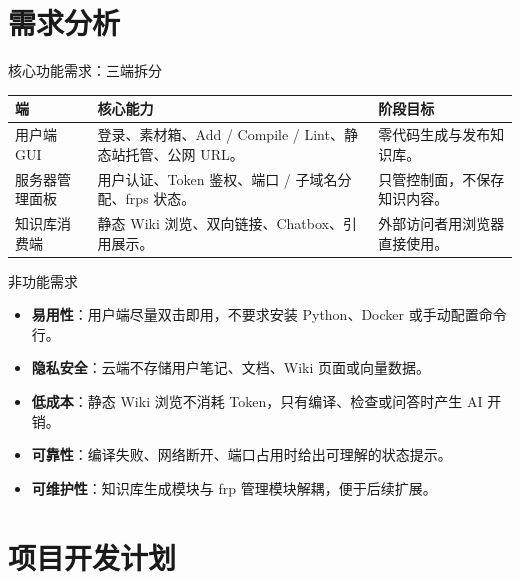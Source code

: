 \documentclass[aspectratio=169]{beamer}
\newcommand{\keypoint}[1]{\textcolor{whu}{\textbf{#1}}}
\begin{document}
\section{需求分析}

\begin{frame}{核心功能需求：三端拆分}
    \small
    \begin{tabularx}{\textwidth}{>{\raggedright\arraybackslash}p{}p{}X}
        \toprule
        \textbf{端} & \textbf{核心能力} & \textbf{阶段目标} \\
        \midrule
        用户端 GUI & 登录、素材箱、Add / Compile / Lint、静态站托管、公网 URL。 & 零代码生成与发布知识库。 \\
        服务器管理面板 & 用户认证、Token 鉴权、端口 / 子域名分配、frps 状态。 & 只管控制面，不保存知识内容。 \\
        知识库消费端 & 静态 Wiki 浏览、双向链接、Chatbox、引用展示。 & 外部访问者用浏览器直接使用。 \\
        \bottomrule
    \end{tabularx}
\end{frame}

\begin{frame}{非功能需求}
    \begin{itemize}
        \item \keypoint{易用性}：用户端尽量双击即用，不要求安装 Python、Docker 或手动配置命令行。
        \item \keypoint{隐私安全}：云端不存储用户笔记、文档、Wiki 页面或向量数据。
        \item \keypoint{低成本}：静态 Wiki 浏览不消耗 Token，只有编译、检查或问答时产生 AI 开销。
        \item \keypoint{可靠性}：编译失败、网络断开、端口占用时给出可理解的状态提示。
        \item \keypoint{可维护性}：知识库生成模块与 frp 管理模块解耦，便于后续扩展。
    \end{itemize}
\end{frame}

\section{项目开发计划}
\end{document}
